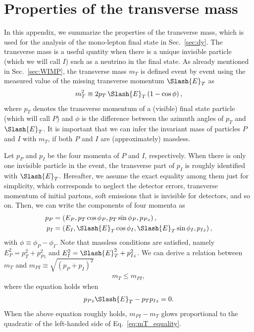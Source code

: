\documentclass[12pt,twoside,book]{article}
\begin{document}
\section{Properties of the transverse mass}
\label{sec:mT}

\vskip 0.1in

In this appendix, we summarize the properties of the transverse mass, which is used for the analysis of the mono-lepton final state in Sec.~\ref{sec:dy}.
The transverse mass is a useful quntity when there is a unique invisible particle (which we will call $I$) such as a neutrino in the final state.
As already mentioned in Sec.~\ref{sec:WIMP}, the transverse mass $m_T$ is defined event by event using the measured value of the missing transverse momentum $\Slash{E}_{T}$ as
\begin{align}
  m_T^2 \equiv 2 p_T\,\Slash{E}_T \left( 1-\cos \phi \right),
\end{align}
where $p_T$ denotes the transverse momentum of a (visible) final state particle (which will call $P$) and $\phi$ is the difference between the azimuth angles of $p_T$ and $\Slash{E}_T$.
It is important that we can infer the invariant mass of particles $P$ and $I$ with $m_T$, if both $P$ and $I$ are (approximately) massless.

Let $p_P$ and $p_I$ be the four momenta of $P$ and $I$, respectively.
When there is only one invisible particle in the event, the transverse part of $p_I$ is roughly identified with $\Slash{E}_T$.
Hereafter, we assume the exact equality among them just for simplicity, which corresponds to neglect the detector errors, transverse momentum of initial partons, soft emissions that is invisible for detectors, and so on.
Then, we can write the components of four momenta as
\begin{align}
  p_P &= \left( E_P, p_T \cos\phi_P, p_T \sin\phi_P, p_{Pz} \right),\\
  p_I &= \left( E_I, \Slash{E}_T \cos\phi_I, \Slash{E}_T \sin\phi_I, p_{Iz} \right),
\end{align}
with $\phi \equiv \phi_P - \phi_I$.
Note that massless conditions are satisfied, namely $E_P^2 = p_T^2 + p_{Pz}^2$ and $E_I^2 = \Slash{E}_T^2 + p_{Iz}^2$.
We can derive a relation between $m_T$ and $m_{PI} \equiv \sqrt{(p_P + p_I)^2}$
\begin{align}
  m_T \leq m_{PI},
\end{align}
where the equation holds when
\begin{align}
  p_{Pz} \Slash{E}_T - p_T p_{Iz} = 0.
  \label{eq:mT_equality}
\end{align}
When the above equation roughly holds, $m_{PI} - m_T$ glows proportional to the quadratic of the left-handed side of Eq.~\eqref{eq:mT_equality}.
\end{document}
